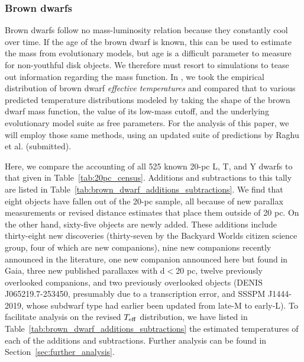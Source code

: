 \documentclass[twocolumn,tighten,twocolappendix]{aastex631}
\begin{document}
\subsubsection{Brown dwarfs\label{sec:brown_dwarfs}}

Brown dwarfs follow no mass-luminosity relation because they constantly cool over time. If the age of the brown dwarf is known, this can be used to estimate the mass from evolutionary models, but age is a difficult parameter to measure for non-youthful disk objects. We therefore must resort to simulations to tease out information regarding the mass function. In \cite{kirkpatrick2019,kirkpatrick2021}, we took the empirical distribution of brown dwarf {\it effective temperatures} and compared that to various predicted temperature distributions modeled by taking the shape of the brown dwarf mass function, the value of its low-mass cutoff, and the underlying evolutionary model suite as free parameters. For the analysis of this paper, we will employ those same methods, using an updated suite of predictions by Raghu et al. (submitted).

Here, we compare the \cite{kirkpatrick2021} accounting of all 525 known 20-pc L, T, and Y dwarfs to that given in Table~\ref{tab:20pc_census}. Additions and subtractions to this tally are listed in Table~\ref{tab:brown_dwarf_additions_subtractions}. We find that eight objects have fallen out of the 20-pc sample, all because of new parallax measurements or revised distance estimates that place them outside of 20 pc. On the other hand, sixty-five objects are newly added. These additions include thirty-eight new discoveries (thirty-seven by the Backyard Worlds citizen science group, four of which are new companions), nine new companions recently announced in the literature, one new companion announced here but found in Gaia, three new published parallaxes with d$<$20 pc, twelve previously overlooked companions, and two previously overlooked objects (DENIS J065219.7-253450, presumably due to a transcription error, and SSSPM J1444-2019, whose subdwarf type had earlier been updated from late-M to early-L). To facilitate analysis on the revised $T_{\rm eff}$ distribution, we have listed in Table~\ref{tab:brown_dwarf_additions_subtractions} the estimated temperatures of each of the additions and subtractions. Further analysis can be found in Section~\ref{sec:further_analysis}.
\end{document}

